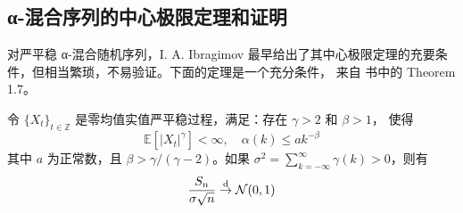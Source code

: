 \subsection{α-混合序列的中心极限定理和证明}

对严平稳 α-混合随机序列，I. A. Ibragimov 最早给出了其中心极限定理的充要条件，但相当繁琐，不易验证。下面的定理是一个充分条件， 来自 \cite{bosq1996} 书中的 Theorem 1.7。

\begin{theorem}
\label{thm:ch4:alpha-mixing-clt}

令 $\{X_{t}\}_{t\in \mathbb{Z}}$ 是零均值实值严平稳过程，满足：存在 $\gamma > 2$ 和 $\beta > 1$， 使得
\[\mathbb{E}[|X_t|^\gamma] < \infty , \quad \alpha (k) \leq a k^{-\beta}\]
其中 $a$ 为正常数，且 $\beta > \gamma / (\gamma - 2)$。如果 $\sigma^2 = \sum_{k = -\infty}^{\infty} \gamma (k) > 0$，则有
\[\frac{S_n}{\sigma\sqrt{n}} \overset{\rm d}\to\mathcal N(0,1)\]
\end{theorem}

